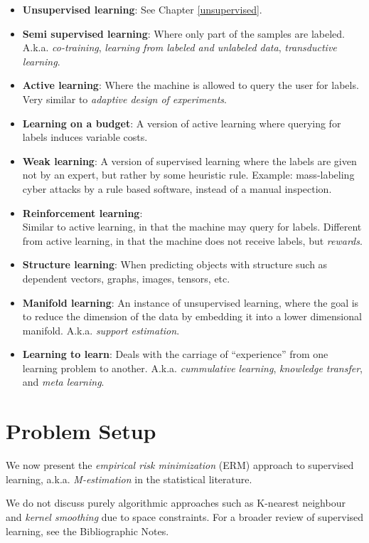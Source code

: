 \documentclass[]{book}
\theoremstyle{definition}
\theoremstyle{definition}
\theoremstyle{definition}
\theoremstyle{remark}
\let\BeginKnitrBlock\begin \let\EndKnitrBlock\end
\begin{document}
\begin{itemize}
\item
  \textbf{Unsupervised learning}: See Chapter \ref{unsupervised}.
\item
  \textbf{Semi supervised learning}: Where only part of the samples are
  labeled. A.k.a. \emph{co-training}, \emph{learning from labeled and
  unlabeled data}, \emph{transductive learning}.
\item
  \textbf{Active learning}: Where the machine is allowed to query the
  user for labels. Very similar to \emph{adaptive design of
  experiments}.
\item
  \textbf{Learning on a budget}: A version of active learning where
  querying for labels induces variable costs.
\item
  \textbf{Weak learning}: A version of supervised learning where the
  labels are given not by an expert, but rather by some heuristic rule.
  Example: mass-labeling cyber attacks by a rule based software, instead
  of a manual inspection.
\item
  \textbf{Reinforcement learning}:\\
  Similar to active learning, in that the machine may query for labels.
  Different from active learning, in that the machine does not receive
  labels, but \emph{rewards}.
\item
  \textbf{Structure learning}: When predicting objects with structure
  such as dependent vectors, graphs, images, tensors, etc.
\item
  \textbf{Manifold learning}: An instance of unsupervised learning,
  where the goal is to reduce the dimension of the data by embedding it
  into a lower dimensional manifold. A.k.a. \emph{support estimation}.
\item
  \textbf{Learning to learn}: Deals with the carriage of ``experience''
  from one learning problem to another. A.k.a. \emph{cummulative
  learning}, \emph{knowledge transfer}, and \emph{meta learning}.
\end{itemize}

\section{Problem Setup}\label{problem-setup-3}

We now present the \emph{empirical risk minimization} (ERM) approach to
supervised learning, a.k.a. \emph{M-estimation} in the statistical
literature.

\BeginKnitrBlock{remark}
{}We do not discuss purely algorithmic
approaches such as K-nearest neighbour and \emph{kernel smoothing} due
to space constraints. For a broader review of supervised learning, see
the Bibliographic Notes.
\EndKnitrBlock{remark}
\end{document}
